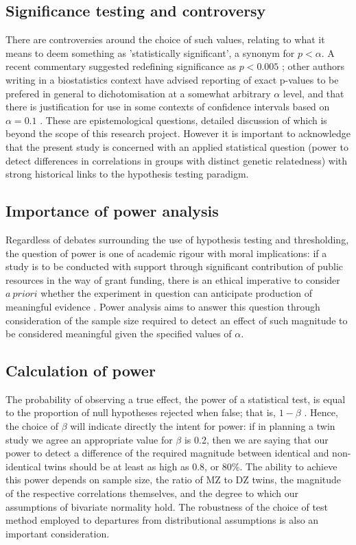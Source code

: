 \subsection{Significance testing and controversy}
There are controversies around the choice of such values, relating to what it means to deem something as 'statistically significant', a synonym for $p < \alpha$. A recent commentary suggested redefining significance as $p < 0.005$ \cite{Benjamin2018}; other authors writing in a biostatistics context have advised reporting of exact p-values to be prefered in general to dichotomisation at a somewhat arbitrary $\alpha$ level, and that there is justification for use in some contexts of confidence intervals based on $\alpha=0.1$ \cite{Clayton1993}.  These are epistemological questions, detailed discussion of which is beyond the scope of this research project.  However it is important to acknowledge that the present study is concerned with an applied statistical question (power to detect differences in correlations in groups with distinct genetic relatedness) with strong historical links to the hypothesis testing paradigm.  

\subsection{Importance of power analysis}
Regardless of debates surrounding the use of hypothesis testing and thresholding, the question of power is one of academic rigour with moral implications: if a study is to be conducted with support through significant contribution of public resources in the way of grant funding, there is an ethical imperative to consider $a \ priori$ whether the experiment in question can anticipate production of meaningful evidence \cite{Freiman1978,Cohen1988}.  Power analysis aims to answer this question through consideration of the sample size required to detect an effect of such magnitude to be considered meaningful given the specified values of $\alpha$.  

\subsection{Calculation of power}
The probability of observing a true effect, the power of a statistical test, is equal to the proportion of null hypotheses rejected when false; that is, $1 - \beta$ \cite{Cohen1988}.  Hence, the choice of $\beta$ will indicate directly the intent for power: if in planning a twin study we agree an appropriate value for $\beta$ is 0.2, then we are saying that our power to detect a difference of the required magnitude between identical and non-identical twins should be at least as high as 0.8, or 80\%. The ability to achieve this power depends on sample size, the ratio of MZ to DZ twins, the magnitude of the respective correlations themselves, and the degree to which our assumptions of bivariate normality hold. The robustness of the choice of test method employed to departures from distributional assumptions is also an important consideration.
